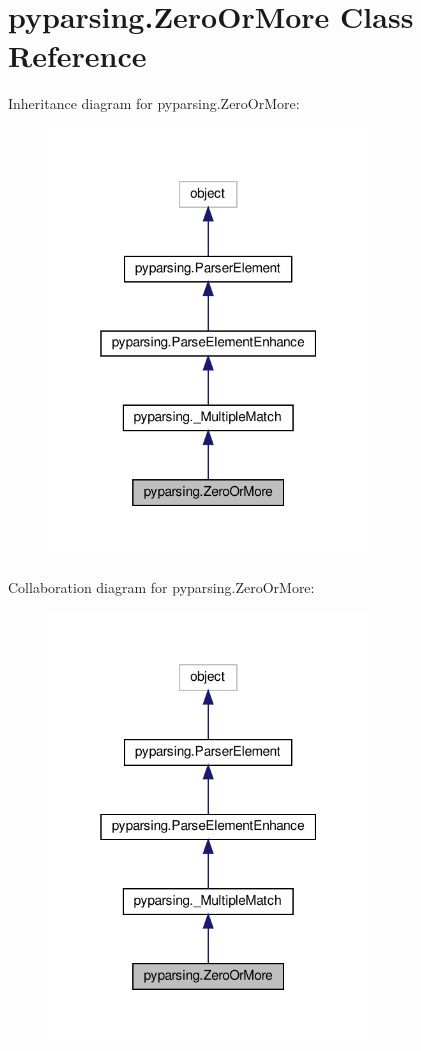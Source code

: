 \hypertarget{classpyparsing_1_1ZeroOrMore}{}\section{pyparsing.\+Zero\+Or\+More Class Reference}
\label{classpyparsing_1_1ZeroOrMore}


Inheritance diagram for pyparsing.\+Zero\+Or\+More\+:
\nopagebreak
\begin{figure}[H]
\begin{center}
\leavevmode
\includegraphics[width=241pt]{classpyparsing_1_1ZeroOrMore__inherit__graph}
\end{center}
\end{figure}


Collaboration diagram for pyparsing.\+Zero\+Or\+More\+:
\nopagebreak
\begin{figure}[H]
\begin{center}
\leavevmode
\includegraphics[width=241pt]{classpyparsing_1_1ZeroOrMore__coll__graph}
\end{center}
\end{figure}
